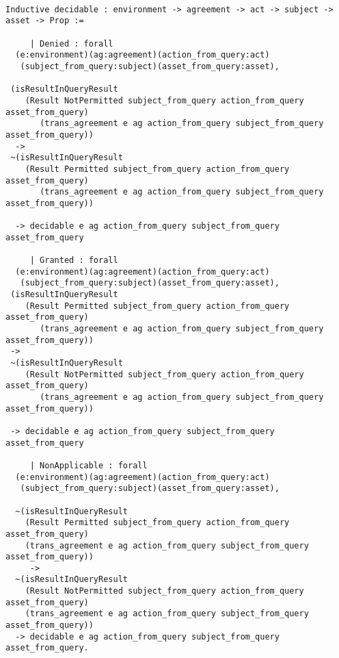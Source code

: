 \begin{minipage}[c]{0.95\textwidth}
\begin{lstlisting}

Inductive decidable : environment -> agreement -> act -> subject -> asset -> Prop :=

     | Denied : forall
  (e:environment)(ag:agreement)(action_from_query:act)
   (subject_from_query:subject)(asset_from_query:asset), 

 (isResultInQueryResult 
    (Result NotPermitted subject_from_query action_from_query asset_from_query)
       (trans_agreement e ag action_from_query subject_from_query asset_from_query)) 
  ->
 ~(isResultInQueryResult 
    (Result Permitted subject_from_query action_from_query asset_from_query)
       (trans_agreement e ag action_from_query subject_from_query asset_from_query)) 

  -> decidable e ag action_from_query subject_from_query asset_from_query

     | Granted : forall
  (e:environment)(ag:agreement)(action_from_query:act)
   (subject_from_query:subject)(asset_from_query:asset), 
 (isResultInQueryResult 
    (Result Permitted subject_from_query action_from_query asset_from_query)
       (trans_agreement e ag action_from_query subject_from_query asset_from_query)) 
 ->
 ~(isResultInQueryResult 
    (Result NotPermitted subject_from_query action_from_query asset_from_query)
       (trans_agreement e ag action_from_query subject_from_query asset_from_query)) 
 
 -> decidable e ag action_from_query subject_from_query asset_from_query

     | NonApplicable : forall
  (e:environment)(ag:agreement)(action_from_query:act)
   (subject_from_query:subject)(asset_from_query:asset), 

  ~(isResultInQueryResult 
    (Result Permitted subject_from_query action_from_query asset_from_query)
    (trans_agreement e ag action_from_query subject_from_query asset_from_query)) 
     ->
  ~(isResultInQueryResult 
    (Result NotPermitted subject_from_query action_from_query asset_from_query)
    (trans_agreement e ag action_from_query subject_from_query asset_from_query)) 
  -> decidable e ag action_from_query subject_from_query asset_from_query.
\end{lstlisting}
\end{minipage}


